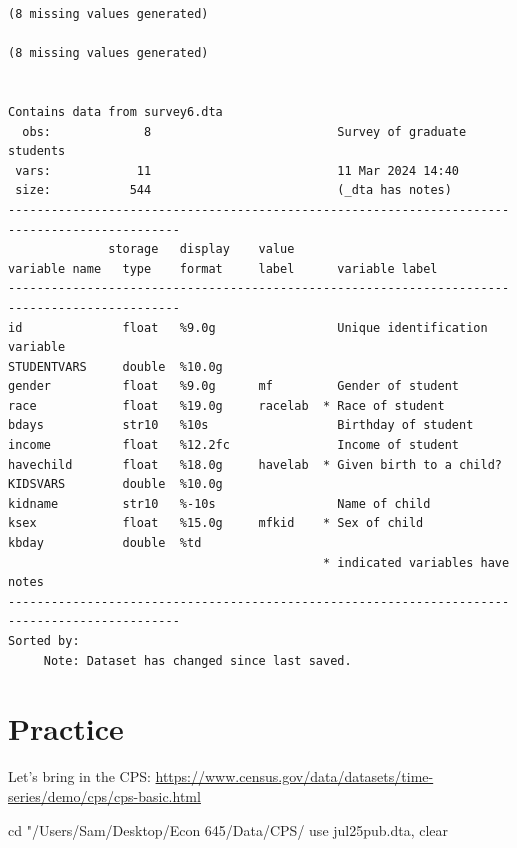 \documentclass[
]{book}
\newenvironment{Shaded}{\begin{snugshade}}{\end{snugshade}}
\newcommand{\NormalTok}[1]{#1}
\newcommand{\StringTok}[1]{\textcolor[rgb]{0.31,0.60,0.02}{#1}}
\begin{document}
\begin{verbatim}
(8 missing values generated)

(8 missing values generated)


Contains data from survey6.dta
  obs:             8                          Survey of graduate students
 vars:            11                          11 Mar 2024 14:40
 size:           544                          (_dta has notes)
----------------------------------------------------------------------------------------------
              storage   display    value
variable name   type    format     label      variable label
----------------------------------------------------------------------------------------------
id              float   %9.0g                 Unique identification variable
STUDENTVARS     double  %10.0g                
gender          float   %9.0g      mf         Gender of student
race            float   %19.0g     racelab  * Race of student
bdays           str10   %10s                  Birthday of student
income          float   %12.2fc               Income of student
havechild       float   %18.0g     havelab  * Given birth to a child?
KIDSVARS        double  %10.0g                
kidname         str10   %-10s                 Name of child
ksex            float   %15.0g     mfkid    * Sex of child
kbday           double  %td                   
                                            * indicated variables have notes
----------------------------------------------------------------------------------------------
Sorted by: 
     Note: Dataset has changed since last saved.
\end{verbatim}

\section{Practice}\label{practice}

Let's bring in the CPS:
\url{https://www.census.gov/data/datasets/time-series/demo/cps/cps-basic.html}

\begin{Shaded}
\begin{Highlighting}[]
\NormalTok{cd }\StringTok{"/Users/Sam/Desktop/Econ 645/Data/CPS/}
\StringTok{use jul25pub.dta, clear}
\end{Highlighting}
\end{Shaded}
\end{document}
